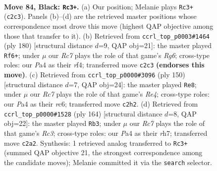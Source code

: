 \documentclass[11pt]{article}
\begin{document}
\clearpage

\begin{figure}[p]\centering
\begin{subfigure}{0.46\textwidth}\centering
\resizebox{\linewidth}{!}{%
\newchessgame
\chessboard[
  setfen={8/8/8/2p2k2/p2p4/3K4/2r5/8 b - - 9 84},
  showmover=false,
  pgfstyle=straightmove, color=movearrow, markmove={c2-c3}
]}
\caption{}
\end{subfigure}\hfill
\begin{subfigure}{0.46\textwidth}\centering
\resizebox{\linewidth}{!}{%
\newchessgame
\chessboard[
  setfen={8/5k2/6R1/5PP1/5r2/8/6K1/8 w - - 13 91},
  showmover=false,
  pgfstyle=straightmove, color=movearrow, markmove={g6-f6}
]}
\caption{}
\end{subfigure}
\\[4pt]
\begin{subfigure}{0.46\textwidth}\centering
\resizebox{\linewidth}{!}{%
\newchessgame
\chessboard[
  setfen={8/8/2r5/5k2/4RP1P/3K4/8/8 w - - 3 76},
  showmover=false,
  pgfstyle=straightmove, color=movearrow, markmove={e4-e8}
]}
\caption{}
\end{subfigure}\hfill
\begin{subfigure}{0.46\textwidth}\centering
\resizebox{\linewidth}{!}{%
\newchessgame
\chessboard[
  setfen={8/7r/8/8/1P1k4/P1R5/5K2/8 w - - 15 83},
  showmover=false,
  pgfstyle=straightmove, color=movearrow, markmove={c3-b3}
]}
\caption{}
\end{subfigure}
\caption{\textbf{Move 84, Black: \texttt{Rc3+}.} (a) Our position; Melanie plays \texttt{Rc3+} (\texttt{c2c3}). Panels (b)--(d) are the retrieved master positions whose correspondence most drove this move (highest QAP objective among those that transfer to it). (b) Retrieved from \texttt{ccrl\_top\_p0003\#1464} (ply 180) [structural distance $d$=9, QAP obj=21]: the master played \texttt{Rf6+}; under $\mu$ our \emph{Rc7} plays the role of that game's \emph{Rg6}; cross-type roles: our \emph{P}a4 as their \emph{r}f4; transferred move \texttt{c2c3} \textbf{(endorses this move)}. (c) Retrieved from \texttt{ccrl\_top\_p0000\#3096} (ply 150) [structural distance $d$=7, QAP obj=24]: the master played \texttt{Re8}; under $\mu$ our \emph{Rc7} plays the role of that game's \emph{Re4}; cross-type roles: our \emph{P}a4 as their \emph{r}c6; transferred move \texttt{c2h2}. (d) Retrieved from \texttt{ccrl\_top\_p0000\#1528} (ply 164) [structural distance $d$=8, QAP obj=22]: the master played \texttt{Rb3}; under $\mu$ our \emph{Rc7} plays the role of that game's \emph{Rc3}; cross-type roles: our \emph{P}a4 as their \emph{r}h7; transferred move \texttt{c2a2}. Synthesis: 1 retrieved analog transferred to \texttt{Rc3+} (summed QAP objective 21, the strongest correspondence among the candidate moves); Melanie committed it via the \texttt{search} selector.}
\label{fig:thought-m167}
\end{figure}
\end{document}
